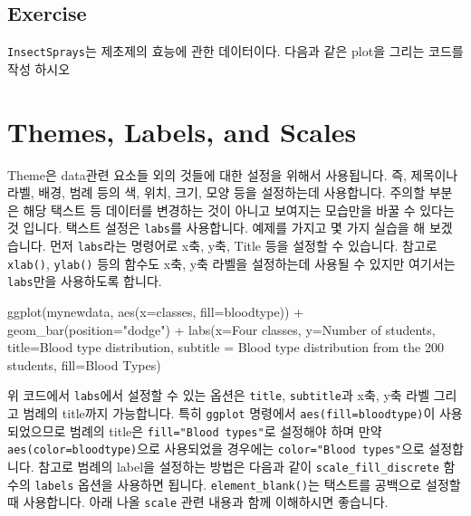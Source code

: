 \documentclass[
]{book}
\newenvironment{Shaded}{\begin{snugshade}}{\end{snugshade}}
\newcommand{\AttributeTok}[1]{\textcolor[rgb]{0.77,0.63,0.00}{#1}}
\newcommand{\FunctionTok}[1]{\textcolor[rgb]{0.00,0.00,0.00}{#1}}
\newcommand{\NormalTok}[1]{#1}
\newcommand{\SpecialCharTok}[1]{\textcolor[rgb]{0.00,0.00,0.00}{#1}}
\newcommand{\StringTok}[1]{\textcolor[rgb]{0.31,0.60,0.02}{#1}}
\begin{document}
\hypertarget{ex10.2}{%
\subsection{Exercise}\label{ex10.2}}

\texttt{InsectSprays}는 제초제의 효능에 관한 데이터이다. 다음과 같은 plot을 그리는 코드를 작성 하시오

\hypertarget{themes-labels-and-scales}{%
\section{Themes, Labels, and Scales}\label{themes-labels-and-scales}}

Theme은 data관련 요소들 외의 것들에 대한 설정을 위해서 사용됩니다. 즉, 제목이나 라벨, 배경, 범례 등의 색, 위치, 크기, 모양 등을 설정하는데 사용합니다. 주의할 부분은 해당 택스트 등 데이터를 변경하는 것이 아니고 보여지는 모습만을 바꿀 수 있다는 것 입니다. 택스트 설정은 \texttt{labs}를 사용합니다. 예제를 가지고 몇 가지 실습을 해 보겠습니다. 먼저 \texttt{labs}라는 명령어로 x축, y축, Title 등을 설정할 수 있습니다. 참고로 \texttt{xlab()}, \texttt{ylab()} 등의 함수도 x축, y축 라벨을 설정하는데 사용될 수 있지만 여기서는 \texttt{labs}만을 사용하도록 합니다.

\begin{Shaded}
\begin{Highlighting}[]
\FunctionTok{ggplot}\NormalTok{(mynewdata, }\FunctionTok{aes}\NormalTok{(}\AttributeTok{x=}\NormalTok{classes, }\AttributeTok{fill=}\NormalTok{bloodtype)) }\SpecialCharTok{+}
  \FunctionTok{geom\_bar}\NormalTok{(}\AttributeTok{position=}\StringTok{"dodge"}\NormalTok{) }\SpecialCharTok{+}
  \FunctionTok{labs}\NormalTok{(}\AttributeTok{x=}\StringTok{\textquotesingle{}Four classes\textquotesingle{}}\NormalTok{,}
       \AttributeTok{y=}\StringTok{\textquotesingle{}Number of students\textquotesingle{}}\NormalTok{,}
       \AttributeTok{title=}\StringTok{\textquotesingle{}Blood type distribution\textquotesingle{}}\NormalTok{,}
       \AttributeTok{subtitle =} \StringTok{\textquotesingle{}Blood type distribution from the 200 students\textquotesingle{}}\NormalTok{,}
       \AttributeTok{fill=}\StringTok{\textquotesingle{}Blood Types\textquotesingle{}}\NormalTok{) }
\end{Highlighting}
\end{Shaded}

위 코드에서 \texttt{labs}에서 설정할 수 있는 옵션은 \texttt{title}, \texttt{subtitle}과 x축, y축 라벨 그리고 범례의 title까지 가능합니다. 특히 \texttt{ggplot} 명령에서 \texttt{aes(fill=bloodtype)}이 사용되었으므로 범례의 title은 \texttt{fill="Blood\ types"}로 설정해야 하며 만약 \texttt{aes(color=bloodtype)}으로 사용되었을 경우에는 \texttt{color="Blood\ types"}으로 설정합니다. 참고로 범례의 label을 설정하는 방법은 다음과 같이 \texttt{scale\_fill\_discrete} 함수의 \texttt{labels} 옵션을 사용하면 됩니다. \texttt{element\_blank()}는 택스트를 공백으로 설정할 때 사용합니다. 아래 나올 \texttt{scale} 관련 내용과 함께 이해하시면 좋습니다.
\end{document}
